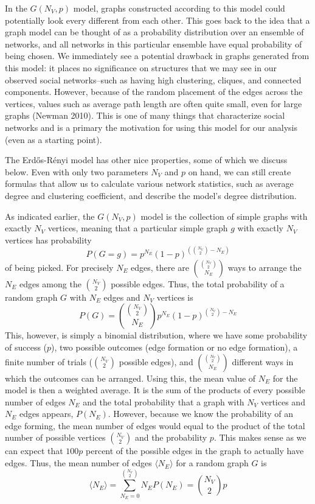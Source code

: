 \documentclass[12pt,twoside]{amherstthesis}
\begin{document}
  In the \(G(N_{V}, p)\) model, graphs constructed according to this model
  could potentially look every different from each other. This goes back
  to the idea that a graph model can be thought of as a probability
  distribution over an ensemble of networks, and all networks in this
  particular ensemble have equal probability of being chosen. We
  immediately see a potential drawback in graphs generated from this
  model: it places no significance on structures that we may see in our
  observed social networks--such as having high clustering, cliques, and
  connected components. However, because of the random placement of the
  edges across the vertices, values such as average path length are often
  quite small, even for large graphs (Newman 2010). This is one of many
  things that characterize social networks and is a primary the motivation
  for using this model for our analysis (even as a starting point).
  
  The Erdős-Rényi model has other nice properties, some of which we
  discuss below. Even with only two parameters \(N_{V}\) and \(p\) on
  hand, we can still create formulas that allow us to calculate various
  network statistics, such as average degree and clustering coefficient,
  and describe the model's degree distribution.
  
  As indicated earlier, the \(G(N_V, p)\) model is the collection of
  simple graphs with exactly \(N_{V}\) vertices, meaning that a particular
  simple graph \(g\) with exactly \(N_V\) vertices has probability
  \[P(G = g) = p^{N_E}(1 - p)^{\left({N_V \choose 2} - N_E \right)}\] of
  being picked. For precisely \(N_E\) edges, there are
  \({{N_{V} \choose 2} \choose N_{E}}\) ways to arrange the \(N_{E}\)
  edges among the \({N_V \choose 2}\) possible edges. Thus, the total
  probability of a random graph \(G\) with \(N_{E}\) edges and \(N_{V}\)
  vertices is
  \[P(G) = {{N_{V} \choose 2} \choose N_{E}}p^{N_E}(1 - p)^{{N_V \choose 2} - N_E}\]
  This, however, is simply a binomial distribution, where we have some
  probability of success (\(p\)), two possible outcomes (edge formation or
  no edge formation), a finite number of trials (\({N_{V} \choose 2}\)
  possible edges), and \({{N_{V} \choose 2} \choose N_{E}}\) different
  ways in which the outcomes can be arranged. Using this, the mean value
  of \(N_E\) for the model is then a weighted average. It is the sum of
  the products of every possible number of edges \(N_E\) and the total
  probability that a graph with \(N_{V}\) vertices and \(N_{E}\) edges
  appears, \(P(N_{E})\). However, because we know the probability of an
  edge forming, the mean number of edges would equal to the product of the
  total number of possible vertices \({N_{V} \choose 2}\) and the
  probability \(p\). This makes sense as we can expect that \(100p\)
  percent of the possible edges in the graph to actually have edges. Thus,
  the mean number of edges \(\langle N_{E} \rangle\) for a random graph
  \(G\) is
  \[ \langle N_{E} \rangle = \sum_{N_{E}=0}^{{N_{V} \choose 2}} N_{E}P(N_{E}) = {N_{V} \choose 2}p\]
  
\end{document}
